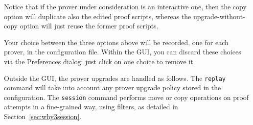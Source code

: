 Notice that if the prover under consideration is an interactive one, then
the copy option will duplicate also the edited proof scripts, whereas
the upgrade-without-copy option will just reuse the former proof scripts.

Your choice between the three options above will be recorded, one for
each prover, in the \why configuration file. Within the GUI, you can
discard these choices via the \textsf{Preferences} dialog: just click on one choice to remove it.

Outside the GUI, the prover upgrades are handled as follows. The
\texttt{replay} command will take into account any prover upgrade policy stored in the configuration.
The \texttt{session} command performs move or copy operations on
proof attempts in a fine-grained way, using filters, as detailed in
Section~\ref{sec:why3session}.




